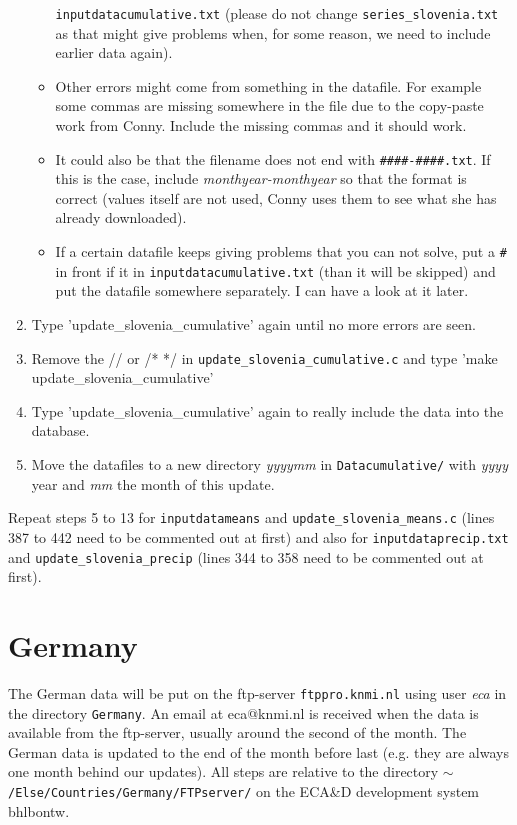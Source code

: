 \documentclass[a4paper]{article}
\begin{document}
\begin{enumerate}
\begin{itemize}
    \texttt{inputdatacumulative.txt} (please do not change
    \texttt{series\_slovenia.txt} as that might give problems when,
    for some reason, we need to include earlier data again).
  \item Other errors might come from something in the datafile. For
    example some commas are missing somewhere in the file due to the
    copy-paste work from Conny. Include the missing commas and it
    should work.
  \item It could also be that the filename does not end with
    \texttt{\#\#\#\#-\#\#\#\#.txt}. If this is the case, include
    \textit{monthyear-monthyear} so that the format is correct (values
    itself are not used, Conny uses them to see what she has already
    downloaded).
  \item If a certain datafile keeps giving problems that you can not
    solve, put a \texttt{\#} in front if it in
    \texttt{inputdatacumulative.txt} (than it will be skipped) and put
    the datafile somewhere separately. I can have a look at it later.
  \end{itemize}
\item Type 'update\_slovenia\_cumulative' again until no more errors
  are seen.
\item Remove the // or /* */ in
  \texttt{update\_slovenia\_cumulative.c} and type 'make
  update\_slovenia\_cumulative'
\item Type 'update\_slovenia\_cumulative' again to really include the
  data into the database.
\item Move the datafiles to a new directory \textit{yyyymm} in
  \texttt{Datacumulative/} with \textit{yyyy} year and \textit{mm} the
  month of this update.
\end{enumerate}

Repeat steps 5 to 13 for \texttt{inputdatameans} and
\texttt{update\_slovenia\_means.c} (lines 387 to 442 need to be
commented out at first) and also for \texttt{inputdataprecip.txt} and
\texttt{update\_slovenia\_precip} (lines 344 to 358 need to be
commented out at first).



\section{Germany}

The German data will be put on the ftp-server \texttt{ftppro.knmi.nl}
using user \textit{eca} in the directory \texttt{Germany}. An email at
eca@knmi.nl is received when the data is available from the
ftp-server, usually around the second of the month. The German data is
updated to the end of the month before last (e.g. they are always one
month behind our updates). All steps are relative to the directory
\texttt{$\sim$/Else/Countries/Germany/FTPserver/} on the ECA\&D
development system bhlbontw.
\end{document}
